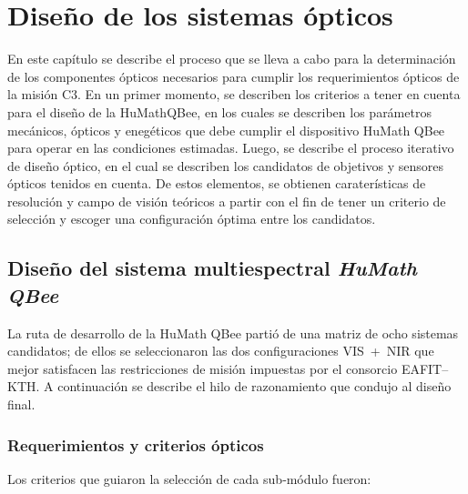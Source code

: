 \chapter{Diseño de los sistemas ópticos}         %

En este capítulo se describe el proceso que se lleva a cabo para la determinación de los componentes ópticos necesarios para cumplir los requerimientos ópticos de la misión C3. En un primer momento, se describen los criterios a tener en cuenta para el diseño de la HuMath\textregistered QBee, en los cuales se describen los parámetros mecánicos, ópticos y enegéticos que debe cumplir el dispositivo HuMath \textregistered QBee para operar en las condiciones estimadas. Luego, se describe el proceso iterativo de diseño óptico, en el cual se describen los candidatos de objetivos y sensores ópticos tenidos en cuenta. De estos elementos, se obtienen caraterísticas de resolución y campo de visión teóricos a partir con el fin de tener un criterio de selección y escoger una configuración óptima entre los candidatos.

\section{Diseño del sistema multiespectral \textit{HuMath \textregistered QBee}}

La ruta de desarrollo de la HuMath \textregistered QBee partió de una matriz de ocho sistemas   candidatos; de ellos se seleccionaron las dos configuraciones VIS + NIR que mejor satisfacen las restricciones de misión impuestas por el consorcio
EAFIT–KTH. A continuación se describe el hilo de razonamiento que condujo al diseño final.

\subsection{Requerimientos y criterios ópticos}

Los criterios que guiaron la selección de cada sub‑módulo fueron:

